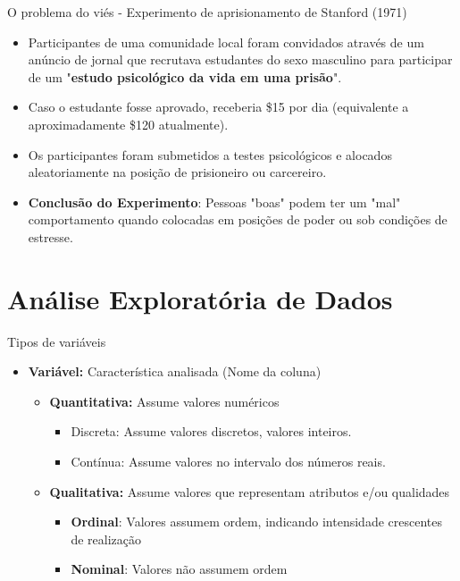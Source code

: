 \begin{frame}{O problema do viés - Experimento de aprisionamento de Stanford (1971)}
\begin{itemize}
    \item Participantes de uma comunidade local foram convidados através de um anúncio de jornal que recrutava estudantes do sexo masculino
    para participar de um "\textbf{estudo psicológico da vida em uma prisão}". 
    \pause
    \item Caso o estudante fosse aprovado, receberia \$15 por dia (equivalente a aproximadamente \$120 atualmente).
    \pause
    \item Os participantes foram submetidos a testes psicológicos e alocados aleatoriamente na posição de prisioneiro ou carcereiro. 
    \item \textbf{Conclusão do Experimento}: Pessoas "boas" podem ter um "mal" comportamento quando colocadas em posições de poder ou sob condições de estresse.  
\end{itemize}
\end{frame}

\section{Análise Exploratória de Dados}

\begin{frame}{Tipos de variáveis}
\begin{itemize}
    \item \textbf{Variável:} Característica analisada (Nome da coluna)
    \begin{itemize}
        \item \textbf{Quantitativa:} Assume valores numéricos 
        \begin{itemize}
            \item Discreta: Assume valores discretos, valores inteiros.
            \item Contínua: Assume valores no intervalo dos números reais.
        \end{itemize}
        \item \textbf{Qualitativa:} Assume valores que representam atributos e/ou qualidades 
        \begin{itemize}
            \item \textbf{Ordinal}: Valores assumem ordem, indicando intensidade crescentes de realização
            \item \textbf{Nominal}: Valores não assumem ordem 
        \end{itemize}
    \end{itemize}
\end{itemize}
\end{frame}

